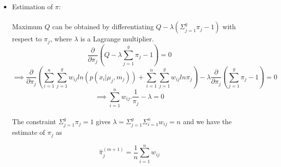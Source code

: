 \documentclass[12pt]{article}
\numberwithin{equation}{section}
\numberwithin{figure}{section}
\numberwithin{table}{section}
\begin{document}
\begin{itemize}
\item Estimation of $\pi$:\\\\
Maximum $Q$ can be obtained by differentiating $Q-\lambda(\varSigma_{j=1}^{g}\pi_j -1)$ with respect to $\pi_j$, where $\lambda$ is a Lagrange multiplier. 
\begin{equation*}
\frac{\partial}{\partial\pi_j}\left( Q-\lambda\sum\limits_{j=1}^{g}\pi_j-1\right) = 0
\end{equation*}
\begin{equation*}
\implies\frac{\partial}{\partial\pi_j}\left( 
\sum\limits_{i=1}^{n}\sum\limits_{j=1}^{g}w_{ij}ln(p(x_i|\mu_j,m_j)) + \sum\limits_{i=1}^{n}\sum\limits_{j=1}^{g}w_{ij}ln\pi_j
\right)
- \lambda\frac{\partial}{\partial\pi_j}\left(\sum\limits_{j=1}^{g}\pi_j-1\right) = 0
\end{equation*}
\begin{equation*}
\implies \sum\limits_{i=1}^{n}w_{ij}.\frac{1}{\pi_j} - \lambda = 0
\end{equation*}\\
The constraint $\varSigma_{j=1}^{g}\pi_j = 1$ gives $\lambda = \varSigma_{j=1}^{g}\varSigma_{i=1}^{n}w_{ij} = n$ and we have the estimate of $\pi_j$ as
{\large
\begin{equation*}
\hat{\pi}_j^{(m+1)} = \frac{1}{n}\sum\limits_{i=1}^{n}w_{ij}
\end{equation*}

}
\end{itemize}
\end{document}
